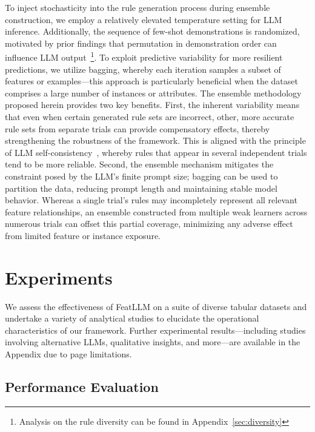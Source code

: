 To inject stochasticity into the rule generation process during ensemble construction, we employ a relatively elevated temperature setting for LLM inference. Additionally, the sequence of few-shot demonstrations is randomized, motivated by prior findings that permutation in demonstration order can influence LLM output~\cite{lu2022fantastically}\footnote{Analysis on the rule diversity can be found in Appendix~\ref{sec:diversity}}. To exploit predictive variability for more resilient predictions, we utilize bagging, whereby each iteration samples a subset of features or examples—this approach is particularly beneficial when the dataset comprises a large number of instances or attributes. The ensemble methodology proposed herein provides two key benefits. First, the inherent variability means that even when certain generated rule sets are incorrect, other, more accurate rule sets from separate trials can provide compensatory effects, thereby strengthening the robustness of the framework. This is aligned with the principle of LLM self-consistency~\cite{wang2022self}, whereby rules that appear in several independent trials tend to be more reliable. Second, the ensemble mechanism mitigates the constraint posed by the LLM's finite prompt size; bagging can be used to partition the data, reducing prompt length and maintaining stable model behavior. Whereas a single trial’s rules may incompletely represent all relevant feature relationships, an ensemble constructed from multiple weak learners across numerous trials can offset this partial coverage, minimizing any adverse effect from limited feature or instance exposure.

\section{Experiments}
We assess the effectiveness of \textsf{FeatLLM} on a suite of diverse tabular datasets and undertake a variety of analytical studies to elucidate the operational characteristics of our framework. Further experimental results—including studies involving alternative LLMs, qualitative insights, and more—are available in the Appendix due to page limitations.

\subsection{Performance Evaluation}
